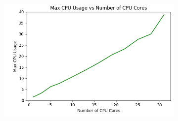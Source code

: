 \documentclass[times, 10pt,twocolumn]{article}
\begin{document}
\begin{figure}[ht]
\begin{subfigure}[b]{0.3\textwidth}
     \caption{}
     \label{fig:plot2}
   \end{subfigure}
   \hfill
   \begin{subfigure}[b]{0.3\textwidth}
      \includegraphics[width=\textwidth]{imgs/study_1_results/var_cpu/floatmatmul/CPU_CPUUsage.png}
     \caption{}
     \label{fig:plot3}
   \end{subfigure}
   

\end{figure}
\end{document}
